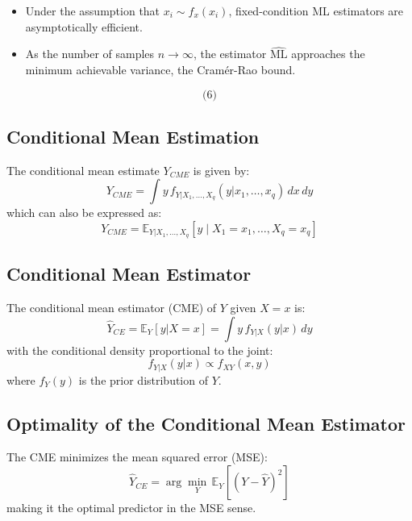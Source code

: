 \documentclass[a4paper, 11pt]{article}
\begin{document}
\begin{itemize}
    \item Under the assumption that \( x_i \sim f_x(x_i) \), fixed-condition ML estimators are asymptotically efficient.
    \item As the number of samples \( n \rightarrow \infty \), the estimator \( \hat{\text{ML}} \) approaches the minimum achievable variance, the Cramér-Rao bound.
\end{itemize}
\begin{equation}
\boxed{
\text{(6)}
}
\end{equation}

\subsection{Conditional Mean Estimation}

The conditional mean estimate \( Y_{CME} \) is given by:
\begin{equation}
Y_{CME} = \int y \, f_{Y|X_1,\dots,X_q}(y | x_1, \dots, x_q) \, dx \, dy
\end{equation}
which can also be expressed as:
\begin{equation}
Y_{CME} = \mathbb{E}_{Y | X_1, \dots, X_q} [ y \mid X_1 = x_1, \dots, X_q = x_q ]
\end{equation}

\subsection{Conditional Mean Estimator}

The conditional mean estimator (CME) of \( Y \) given \( X = x \) is:
\begin{equation}
\hat{Y}_{CE} = \mathbb{E}_Y [ y | X = x ] = \int y \, f_{Y|X}(y|x) \, dy
\end{equation}
with the conditional density proportional to the joint:
\begin{equation}
f_{Y|X}(y|x) \propto f_{XY}(x, y)
\end{equation}
where \( f_Y(y) \) is the prior distribution of \( Y \).

\subsection{Optimality of the Conditional Mean Estimator}

The CME minimizes the mean squared error (MSE):
\begin{equation}
\boxed{
\hat{Y}_{CE} = \arg \min_Y \, \mathbb{E}_Y \left[ (Y - \hat{Y})^2 \right]
}
\end{equation}
making it the optimal predictor in the MSE sense.
\end{document}
